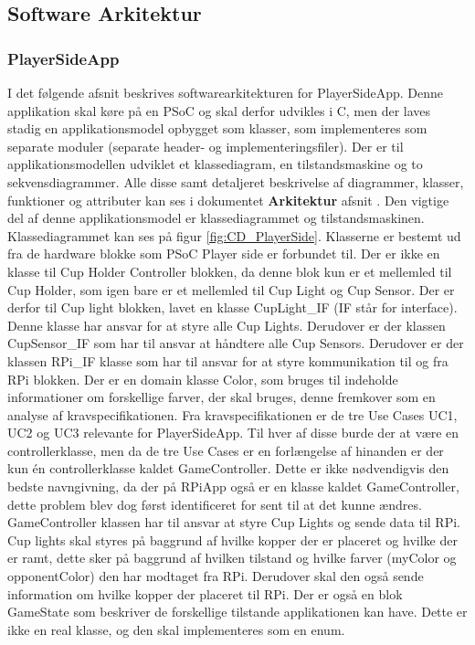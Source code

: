\documentclass[Rapport/Rapport_main.tex]{subfiles}
\begin{document}
\subsection{Software Arkitektur}

\subsubsection{PlayerSideApp}
I det følgende afsnit beskrives softwarearkitekturen for PlayerSideApp. Denne applikation skal køre på en PSoC og skal derfor udvikles i C, men der laves stadig en  applikationsmodel opbygget som klasser, som implementeres som separate moduler (separate header- og implementeringsfiler). Der er til applikationsmodellen udviklet et klassediagram, en tilstandsmaskine og to sekvensdiagrammer. Alle disse samt detaljeret beskrivelse af diagrammer, klasser, funktioner og attributer kan ses i dokumentet \textbf{Arkitektur} afsnit . Den vigtige del af denne applikationsmodel er klassediagrammet og tilstandsmaskinen. Klassediagrammet kan ses på figur \ref{fig:CD_PlayerSide}. Klasserne er bestemt ud fra de hardware blokke som PSoC Player side er forbundet til. Der er ikke en klasse til Cup Holder Controller blokken, da denne blok kun er et mellemled til Cup Holder, som igen bare er et mellemled til Cup Light og Cup Sensor. Der er derfor til Cup light blokken, lavet en klasse CupLight\_IF (IF står for interface). Denne klasse har ansvar for at styre alle Cup Lights. Derudover er der klassen CupSensor\_IF som har til ansvar at håndtere alle Cup Sensors. Derudover er der klassen RPi\_IF klasse som har til ansvar for at styre kommunikation til og fra RPi blokken. Der er en domain klasse Color, som bruges til indeholde informationer om forskellige farver, der skal bruges, denne fremkover som en analyse af kravspecifikationen. Fra kravspecifikationen er de tre Use Cases UC1, UC2 og UC3 relevante for PlayerSideApp. Til hver af disse burde der at være en controllerklasse, men da de tre Use Cases er en forlængelse af hinanden er der kun én controllerklasse kaldet GameController. Dette er ikke nødvendigvis den bedste navngivning, da der på RPiApp også er en klasse kaldet GameController, dette problem blev dog først identificeret for sent til at det kunne ændres. GameController klassen har til ansvar at styre Cup Lights og sende data til RPi. Cup lights skal styres på baggrund af hvilke kopper der er placeret og hvilke der er ramt, dette sker på baggrund af hvilken tilstand og hvilke farver (myColor og opponentColor) den har modtaget fra RPi. Derudover skal den også sende information om hvilke kopper der placeret til RPi. Der er også en blok GameState som beskriver de forskellige tilstande applikationen kan have. Dette er ikke en real klasse, og den skal implementeres som en enum. 
\end{document}
